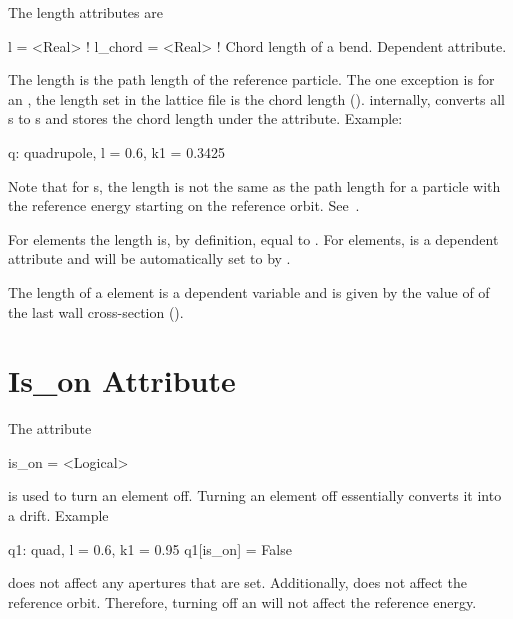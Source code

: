 The length attributes are
\begin{example}
  l       = <Real>  ! 
  l_chord = <Real>  ! Chord length of a bend. Dependent attribute.
\end{example}
The length  is the path length of the reference particle. The
one exception is for an , the length  set in the
lattice file is the chord length (). internally, \bmad
converts all s to s and stores the chord length
under the  attribute.
Example:
\begin{example}
  q: quadrupole, l = 0.6, k1 = 0.3425
\end{example}

Note that for s, the length  is not the same as the
path length for a particle with the reference energy starting on the
reference orbit. See~.

For  elements the  length is, by definition, equal to
. For  elements,  is a dependent
attribute and will be automatically set to  by \bmad.

The length of a  element is a dependent variable and is
given by the value of  of the last wall cross-section
().

\section{Is_on Attribute}
\label{s:is.on}

The  attribute
\begin{example}
  is_on = <Logical>
\end{example}
is used to turn an element off. Turning
an element off essentially converts it into a drift.
Example
\begin{example}
  q1: quad, l = 0.6, k1 = 0.95
  q1[is_on] = False
\end{example}

 does not affect any apertures that are set. Additionally,
 does not affect the reference orbit. Therefore, turning 
off an  will not affect the reference energy.

